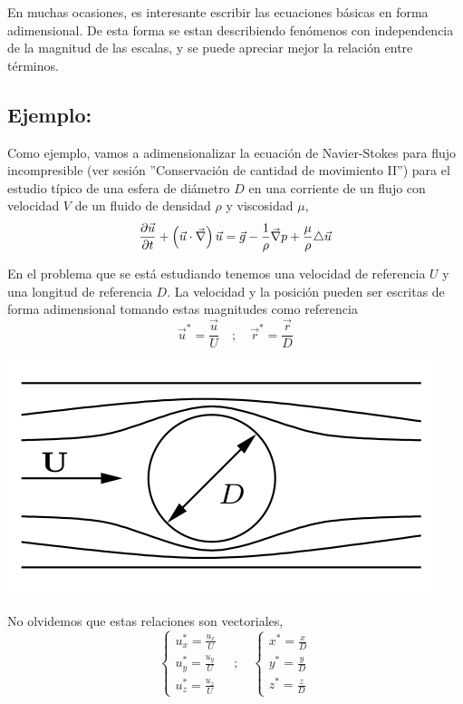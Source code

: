 	
	
	En muchas ocasiones, es interesante escribir las ecuaciones básicas
	en forma adimensional. De esta forma se estan describiendo fenómenos
	con independencia de la magnitud de las escalas, y se puede apreciar
	mejor la relación entre términos.
	\subsection*{Ejemplo:}
		Como ejemplo, vamos a adimensionalizar la ecuación de Navier-Stokes
		para flujo incompresible (ver sesión ''Conservación de cantidad de
		movimiento II'') para el estudio típico de una esfera de diámetro
		$D$ en una corriente de un flujo con velocidad $V$ de un fluido
		de densidad $\rho$ y viscosidad $\mu$,
		\[
		\frac{\partial \vec{u}}{\partial t}+\left(\vec{u}\cdot\vec{\nabla}\right)\vec{u}=\vec{g}-\frac{1}{\rho}\vec{\nabla}p+\frac{\mu}{\rho}\triangle\vec{u}
		\]
		

			En el problema que se está estudiando tenemos una velocidad de referencia
			$U$ y una longitud de referencia $D$. La velocidad y la posición
			pueden ser escritas de forma adimensional tomando estas magnitudes
			como referencia 
			\[
			\vec{u}^{\ast}=\frac{\vec{u}}{U}\quad;\quad\vec{r}^{\ast}=\frac{\vec{r}}{D}
			\]
\begin{center}
	\includegraphics[width=0.5\linewidth]{TeX_files/chapter06-ADimensional/esfera}
\end{center}

		
		No olvidemos que estas relaciones son vectoriales, 
		\[
		\left\{ \begin{array}{l}
			u_{x}^{\ast}=\frac{u_{x}}{U}\\
			u_{y}^{\ast}=\frac{u_{y}}{U}\\
			u_{z}^{\ast}=\frac{u_{z}}{U}
		\end{array}\right.\quad;\quad\left\{ \begin{array}{l}
			x^{\ast}=\frac{x}{D}\\
			y^{\ast}=\frac{y}{D}\\
			z^{\ast}=\frac{z}{D}
		\end{array}\right.
		\]
		
